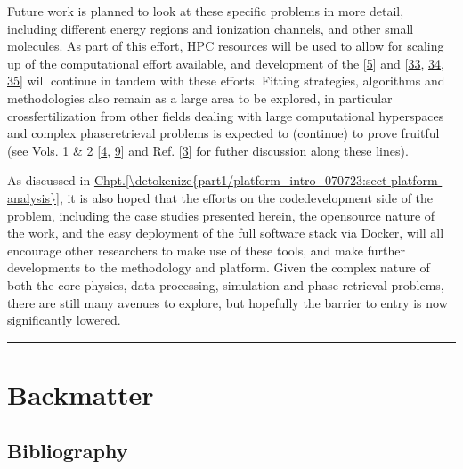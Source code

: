 \documentclass[letterpaper,table,10pt,english]{jupyterBook}
\begin{document}
\sphinxAtStartPar
Future work is planned to look at these specific problems in more detail, including different energy regions and ionization channels, and other small molecules. As part of this effort, HPC resources will be used to allow for scaling up of the computational effort available, and development of the  {[}\hyperlink{cite.backmatter/bibliography:id681}{5}{]} and  {[}\hyperlink{cite.backmatter/bibliography:id665}{33}, \hyperlink{cite.backmatter/bibliography:id607}{34}, \hyperlink{cite.backmatter/bibliography:id605}{35}{]} will continue in tandem with these efforts. Fitting strategies, algorithms and methodologies also remain as a large area to be explored, in particular cross\sphinxhyphen{}fertilization from other fields dealing with large computational hyperspaces and complex phase\sphinxhyphen{}retrieval problems is expected to (continue) to prove fruitful (see  Vols. 1 \& 2 {[}\hyperlink{cite.backmatter/bibliography:id676}{4}, \hyperlink{cite.backmatter/bibliography:id677}{9}{]} and Ref. {[}\hyperlink{cite.backmatter/bibliography:id685}{3}{]} for futher discussion along these lines).

\sphinxAtStartPar
As discussed in \hyperref[\detokenize{part1/platform_intro_070723:sect-platform-analysis}]{Chpt.\@ \ref{\detokenize{part1/platform_intro_070723:sect-platform-analysis}}}, it is also hoped that the efforts on the code\sphinxhyphen{}development side of the problem, including the case studies presented herein, the open\sphinxhyphen{}source nature of the work, and the easy deployment of the full software stack via Docker, will all encourage other researchers to make use of these tools, and make further developments to the methodology and platform. Given the complex nature of both the core physics, data processing, simulation and phase retrieval problems, there are still many avenues to explore, but hopefully the barrier to entry is now significantly lowered.


\bigskip\hrule\bigskip


\sphinxstepscope


\part{Backmatter}

\sphinxstepscope


\chapter{Bibliography}
\label{\detokenize{backmatter/bibliography:bibliography}}\label{\detokenize{backmatter/bibliography::doc}}\label{\detokenize{backmatter/bibliography:id1}}
\sphinxstepscope
\end{document}
